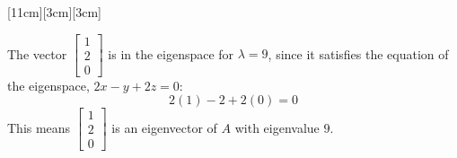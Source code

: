 \documentclass[11pt]{article}
\begin{document}
\begin{prob}[(11 pts)]
\begin{subprob}
[11cm][3cm][3cm]
\begin{solution}
The vector $\begin{bmatrix}1\\2\\0\end{bmatrix}$ is in the eigenspace for $\lambda=9$, since it satisfies the equation of the eigenspace, $2x-y+2z=0$:
\[
2(1)-2+2(0)=0
\]
This means $\begin{bmatrix}1\\2\\0\end{bmatrix}$ is an eigenvector of $A$ with eigenvalue $9$. \\


\end{solution}
\end{subprob}
\end{prob}
\end{document}
